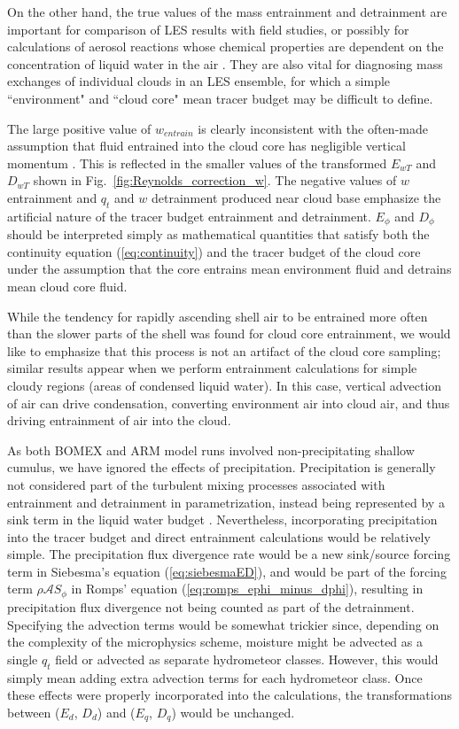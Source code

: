 \documentclass[12pt]{article}
\begin{document}
On the other hand, the true values of the mass entrainment and 
detrainment are important for comparison of LES results with field 
studies, or possibly for calculations of aerosol reactions whose chemical 
properties are dependent on the concentration of liquid water in the air 
\citep{Hoppel1994}.  They are also vital for diagnosing mass exchanges 
of individual clouds in an LES ensemble, for which a simple ``environment" 
and ``cloud core" mean tracer budget may be difficult to define.

The large positive value of $w_{entrain}$ is clearly inconsistent with 
the often-made assumption that fluid entrained into the cloud core has 
negligible vertical momentum \citep{Simpson1969,Gregory2001,Siebesma2003}.  
This is reflected in the smaller values of the transformed $E_{wT}$ and 
$D_{wT}$ shown in Fig.~\ref{fig:Reynolds_correction_w}.  The negative 
values of $w$ entrainment and $q_t$ and $w$ detrainment produced near 
cloud base emphasize the artificial nature of the tracer budget 
entrainment and detrainment.  $E_{\phi}$ and $D_{\phi}$ should be 
interpreted simply as mathematical quantities that satisfy both the 
continuity equation (\ref{eq:continuity}) and the tracer budget of the 
cloud core under the assumption that the core entrains mean environment 
fluid and detrains mean cloud core fluid.

While the tendency for rapidly ascending shell air to be entrained more 
often than the slower parts of the shell was found for cloud core 
entrainment, we would like to emphasize that this process is not an 
artifact of the cloud core sampling; similar results appear when we 
perform entrainment calculations for simple cloudy regions (areas of 
condensed liquid water).  In this case, vertical advection of air can 
drive condensation, converting environment air into cloud air, and thus 
driving entrainment of air into the cloud.

As both BOMEX and ARM model runs involved non-precipitating shallow 
cumulus, we have ignored the effects of precipitation.  Precipitation is 
generally not considered part of the turbulent mixing processes 
associated with entrainment and detrainment in parametrization, instead 
being represented by a sink term in the liquid water budget 
\citep{Tiedtke1989, Kain1990}.  Nevertheless, incorporating 
precipitation into the tracer budget and direct entrainment calculations 
would be relatively simple.  The precipitation flux divergence rate 
would be a new sink/source forcing term in Siebesma's equation 
(\ref{eq:siebesmaED}), and would be part of the forcing term 
$\rho \mathcal{A}S_\phi$ in Romps' equation 
(\ref{eq:romps_ephi_minus_dphi}), resulting in precipitation flux 
divergence not being counted as part of the detrainment.  Specifying the 
advection terms would be somewhat trickier since, depending on the 
complexity of the microphysics scheme, moisture might be advected as a 
single $q_t$ field or advected as separate hydrometeor classes.  However, 
this would simply mean adding extra advection terms for each hydrometeor 
class.  Once these effects were properly incorporated into the 
calculations, the transformations between ($E_d$, $D_d$) and 
($E_q$, $D_q$) would be unchanged.
\end{document}
